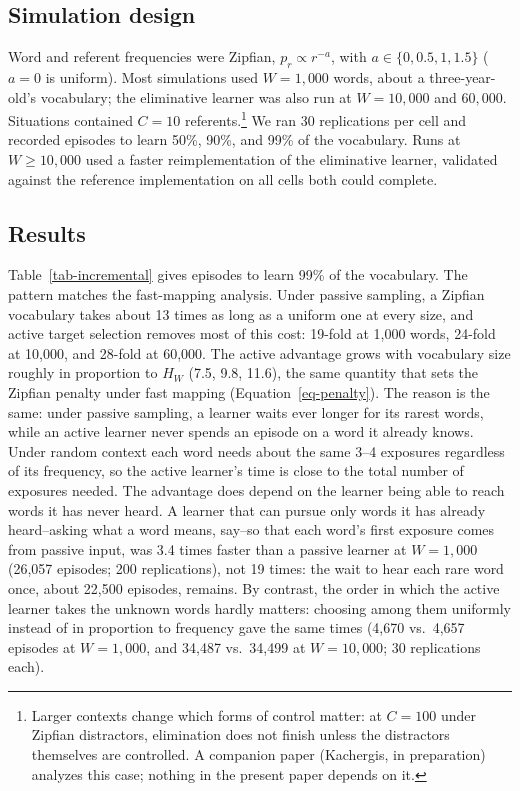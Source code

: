 \documentclass[a4paper,natbib,man]{apa6}
\begin{document}
\subsection{Simulation design}
Word and referent frequencies were Zipfian, $p_r \propto r^{-a}$, with $a \in \{0, 0.5, 1, 1.5\}$ ($a=0$ is uniform). Most simulations used $W = 1{,}000$ words, about a three-year-old's vocabulary; the eliminative learner was also run at $W = 10{,}000$ and $60{,}000$. Situations contained $C = 10$ referents.\footnote{Larger contexts change which forms of control matter: at $C=100$ under Zipfian distractors, elimination does not finish unless the distractors themselves are controlled. A companion paper (Kachergis, in preparation) analyzes this case; nothing in the present paper depends on it.} We ran 30 replications per cell and recorded episodes to learn 50\%, 90\%, and 99\% of the vocabulary. Runs at $W \ge 10{,}000$ used a faster reimplementation of the eliminative learner, validated against the reference implementation on all cells both could complete.

\subsection{Results}
Table~\ref{tab-incremental} gives episodes to learn 99\% of the vocabulary. The pattern matches the fast-mapping analysis. Under passive sampling, a Zipfian vocabulary takes about 13 times as long as a uniform one at every size, and active target selection removes most of this cost: 19-fold at 1,000 words, 24-fold at 10,000, and 28-fold at 60,000. The active advantage grows with vocabulary size roughly in proportion to $H_W$ (7.5, 9.8, 11.6), the same quantity that sets the Zipfian penalty under fast mapping (Equation~\ref{eq-penalty}). The reason is the same: under passive sampling, a learner waits ever longer for its rarest words, while an active learner never spends an episode on a word it already knows. Under random context each word needs about the same 3--4 exposures regardless of its frequency, so the active learner's time is close to the total number of exposures needed. The advantage does depend on the learner being able to reach words it has never heard. A learner that can pursue only words it has already heard--asking what a word means, say--so that each word's first exposure comes from passive input, was 3.4 times faster than a passive learner at $W=1{,}000$ (26,057 episodes; 200 replications), not 19 times: the wait to hear each rare word once, about 22,500 episodes, remains. By contrast, the order in which the active learner takes the unknown words hardly matters: choosing among them uniformly instead of in proportion to frequency gave the same times (4,670 vs.\ 4,657 episodes at $W=1{,}000$, and 34,487 vs.\ 34,499 at $W=10{,}000$; 30 replications each).
\end{document}
